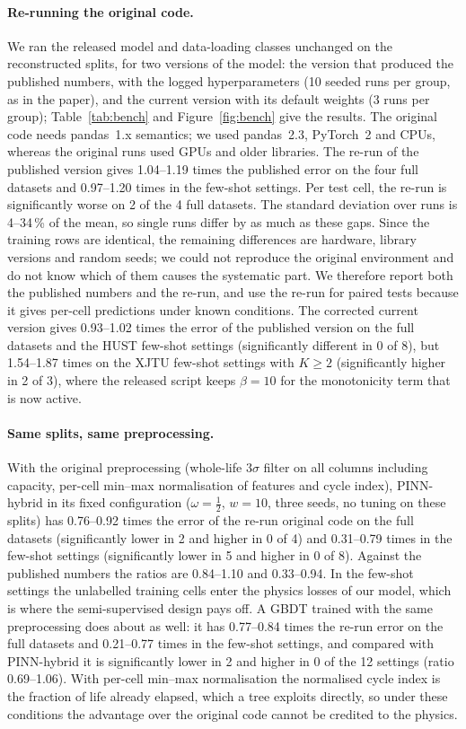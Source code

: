 {\paragraph{Re-running the original code.} We ran the released model and data-loading classes unchanged on the reconstructed splits, for two versions of the model: the version that produced the published numbers, with the logged hyperparameters (10 seeded runs per group, as in the paper), and the current version with its default weights (3 runs per group); Table~\ref{tab:bench} and Figure~\ref{fig:bench} give the results. The original code needs pandas~1.x semantics; we used pandas~2.3, PyTorch~2 and CPUs, whereas the original runs used GPUs and older libraries. The re-run of the published version gives 1.04--1.19 times the published error on the four full datasets and 0.97--1.20 times in the few-shot settings. Per test cell, the re-run is significantly worse on 2 of the 4 full datasets. The standard deviation over runs is 4--34\,\% of the mean, so single runs differ by as much as these gaps. Since the training rows are identical, the remaining differences are hardware, library versions and random seeds; we could not reproduce the original environment and do not know which of them causes the systematic part. We therefore report both the published numbers and the re-run, and use the re-run for paired tests because it gives per-cell predictions under known conditions. The corrected current version gives 0.93--1.02 times the error of the published version on the full datasets and the HUST few-shot settings (significantly different in 0 of 8), but 1.54--1.87 times on the XJTU few-shot settings with $K \ge 2$ (significantly higher in 2 of 3), where the released script keeps $\beta = 10$ for the monotonicity term that is now active.

\paragraph{Same splits, same preprocessing.} With the original preprocessing (whole-life $3\sigma$ filter on all columns including capacity, per-cell min--max normalisation of features and cycle index), PINN-hybrid in its fixed configuration ($\omega = \tfrac12$, $w = 10$, three seeds, no tuning on these splits) has 0.76--0.92 times the error of the re-run original code on the full datasets (significantly lower in 2 and higher in 0 of 4) and 0.31--0.79 times in the few-shot settings (significantly lower in 5 and higher in 0 of 8). Against the published numbers the ratios are 0.84--1.10 and 0.33--0.94. In the few-shot settings the unlabelled training cells enter the physics losses of our model, which is where the semi-supervised design pays off. A GBDT trained with the same preprocessing does about as well: it has 0.77--0.84 times the re-run error on the full datasets and 0.21--0.77 times in the few-shot settings, and compared with PINN-hybrid it is significantly lower in 2 and higher in 0 of the 12 settings (ratio 0.69--1.06). With per-cell min--max normalisation the normalised cycle index is the fraction of life already elapsed, which a tree exploits directly, so under these conditions the advantage over the original code cannot be credited to the physics.

}
